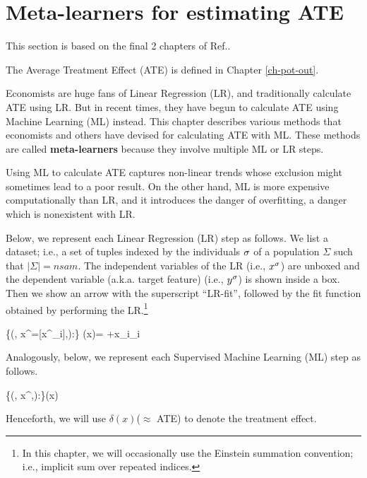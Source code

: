 \chapter{Meta-learners
for estimating ATE}
\label{ch-meta-learners}


This section
is based on the final 2 chapters of
Ref.\cite{alves-book}.

The Average Treatment Effect (ATE)
is defined in Chapter \ref{ch-pot-out}.

Economists are huge fans of Linear Regression (LR),
and traditionally calculate  ATE using LR.
But in recent times,
they have begun to
calculate ATE using Machine Learning
(ML) instead. 
This chapter describes various methods
that economists and others have devised
for calculating ATE with ML.
These methods
are called {\bf meta-learners}
because they involve multiple
ML or LR steps.

Using ML
to calculate
ATE
captures non-linear trends
whose exclusion might sometimes lead to a poor result. 
On the other hand,
ML is more expensive computationally
than LR, 
and it introduces
the danger of overfitting, a danger
which is nonexistent with LR.




Below,
we represent each
Linear Regression (LR) step
as follows. 
We list a dataset; i.e., a 
set of tuples indexed by
the individuals $\sigma$
of a population $\Sigma$
such that $|\Sigma|=nsam$.
The independent variables 
of the LR (i.e., $x^\sigma$)
are unboxed and the
 dependent variable 
(a.k.a. target feature)
(i.e., $y^\sigma$)
is shown inside a box.
Then we show an arrow with the
superscript \enquote{LR-fit},
followed by the fit function
obtained by performing the LR.\footnote{
In this chapter,
we will occasionally
use the Einstein summation convention;
i.e.,
implicit sum over
repeated indices.}



\beq
\{(\s, x^\s =[x^\s_i],):\s\in \Sigma\}
\lrarr
 \haty(x)=
\alp +x_i\beta_i
\eeq


Analogously, below,
we represent each
Supervised Machine
 Learning (ML) step as follows.


\beq
\{(\s, x^\s,):\s\in \Sigma\}\mlarr \haty(x)
\label{eq-gen-ml}
\eeq


Henceforth, we will use $\delta(x)$($\approx$ ATE) to
denote the treatment effect.



